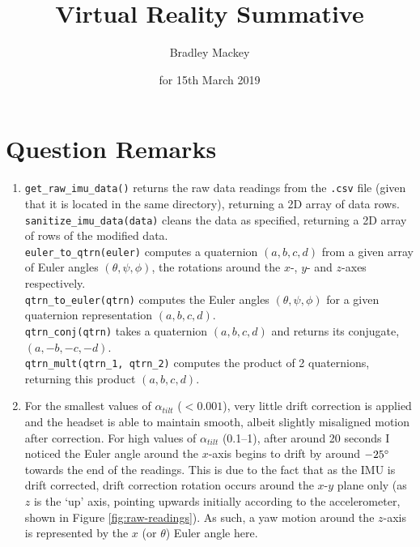 \documentclass[11pt]{article}
\makeatletter
\newcommand{\skipitems}[1]{%
  \addtocounter{\@enumctr}{#1}%
}
\makeatother
\begin{document}
\title{\textbf{Virtual Reality Summative}}
\date{for 15th March 2019}
\author{Bradley Mackey}
\maketitle


\section*{Question Remarks}

\begin{enumerate}
\item 
\texttt{get\_raw\_imu\_data()} returns the raw data readings from the \texttt{.csv} file (given that it is located in the same directory), returning a 2D array of data rows.\\
\texttt{sanitize\_imu\_data(data)} cleans the data as specified, returning a 2D array of rows of the modified data.\\
\texttt{euler\_to\_qtrn(euler)} computes a quaternion $(a,b,c,d)$ from a given array of Euler angles $(\theta,\psi,\phi)$, the rotations around the $x$-, $y$- and $z$-axes respectively.\\
\texttt{qtrn\_to\_euler(qtrn)} computes the Euler angles $(\theta,\psi,\phi)$ for a given quaternion representation $(a,b,c,d)$.\\
\texttt{qtrn\_conj(qtrn)} takes a quaternion $(a,b,c,d)$ and returns its conjugate, $(a,-b,-c,-d)$.\\
\texttt{qtrn\_mult(qtrn\_1, qtrn\_2)} computes the product of 2 quaternions, returning this product $(a,b,c,d)$.

\skipitems{1} 


\item 

For the smallest values of $\alpha_{tilt}$ ($<0.001$), very little drift correction is applied and the headset is able to maintain smooth, albeit slightly misaligned motion after correction. 
For high values of $\alpha_{tilt}$ (0.1--1), after around 20 seconds I noticed the Euler angle around the $x$-axis begins to drift by around $-25\degree$ towards the end of the readings. 
This is due to the fact that as the IMU is drift corrected, drift correction rotation occurs around the $x$-$y$ plane only (as $z$ is the `up' axis, pointing upwards initially according to the accelerometer, shown in Figure \ref{fig:raw-readings}). 
As such, a yaw motion around the $z$-axis is represented by the $x$ (or $\theta$) Euler angle here. 


\end{enumerate}
\end{document}
